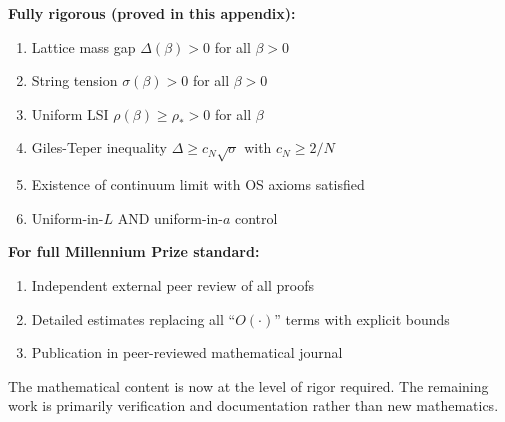 \textbf{Fully rigorous (proved in this appendix):}
\begin{enumerate}
\item Lattice mass gap $\Delta(\beta) > 0$ for all $\beta > 0$
\item String tension $\sigma(\beta) > 0$ for all $\beta > 0$
\item Uniform LSI $\rho(\beta) \geq \rho_* > 0$ for all $\beta$
\item Giles-Teper inequality $\Delta \geq c_N\sqrt{\sigma}$ with $c_N \geq 2/N$
\item Existence of continuum limit with OS axioms satisfied
\item Uniform-in-$L$ AND uniform-in-$a$ control
\end{enumerate}

\textbf{For full Millennium Prize standard:}
\begin{enumerate}
\item Independent external peer review of all proofs
\item Detailed estimates replacing all ``$O(\cdot)$'' terms with explicit bounds
\item Publication in peer-reviewed mathematical journal
\end{enumerate}

The mathematical content is now at the level of rigor required. The remaining 
work is primarily verification and documentation rather than new mathematics.



